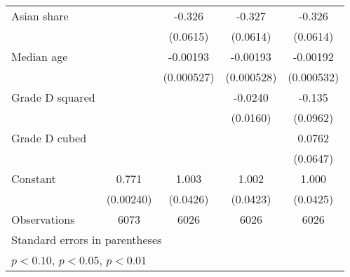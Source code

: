 {\begin{tabular}{l*{4}{c}}
\addlinespace
Asian share         &                     &      -0.326\sym{***}&      -0.327\sym{***}&      -0.326\sym{***}\\
                    &                     &    (0.0615)         &    (0.0614)         &    (0.0614)         \\
\addlinespace
Median age          &                     &    -0.00193\sym{***}&    -0.00193\sym{***}&    -0.00192\sym{***}\\
                    &                     &  (0.000527)         &  (0.000528)         &  (0.000532)         \\
\addlinespace
Grade D squared     &                     &                     &     -0.0240         &      -0.135         \\
                    &                     &                     &    (0.0160)         &    (0.0962)         \\
\addlinespace
Grade D cubed       &                     &                     &                     &      0.0762         \\
                    &                     &                     &                     &    (0.0647)         \\
\addlinespace
Constant            &       0.771\sym{***}&       1.003\sym{***}&       1.002\sym{***}&       1.000\sym{***}\\
                    &   (0.00240)         &    (0.0426)         &    (0.0423)         &    (0.0425)         \\
\midrule
Observations        &        6073         &        6026         &        6026         &        6026         \\
\bottomrule
\multicolumn{5}{l}{\footnotesize Standard errors in parentheses}\\
\multicolumn{5}{l}{\footnotesize \sym{*} \(p<0.10\), \sym{**} \(p<0.05\), \sym{***} \(p<0.01\)}\\
\end{tabular}
}
